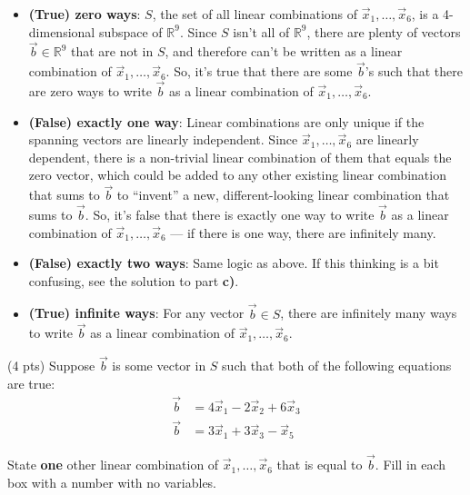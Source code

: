 \documentclass[11pt]{article}
\begin{document}
\begin{prob}[(14 pts)]
\begin{subprob}
\begin{solution}[parts (i)-(iv)]
\begin{itemize}
    \item \textbf{(True) zero ways}: $S$, the set of all linear combinations of $\vec x_1, \ldots, \vec x_6$, is a 4-dimensional subspace of $\mathbb{R}^9$. Since $S$ isn't all of $\mathbb{R}^9$, there are plenty of vectors $\vec b \in \mathbb{R}^9$ that are not in $S$, and therefore can't be written as a linear combination of $\vec x_1, \ldots, \vec x_6$. So, it's true that there are some $\vec b$'s such that there are zero ways to write $\vec b$ as a linear combination of $\vec x_1, \ldots, \vec x_6$.
    \item \textbf{(False) exactly one way}: Linear combinations are only unique if the spanning vectors are linearly independent. Since $\vec x_1, \ldots, \vec x_6$ are linearly dependent, there is a non-trivial linear combination of them that equals the zero vector, which could be added to any other existing linear combination that sums to $\vec b$ to ``invent'' a new, different-looking linear combination that sums to $\vec b$. So, it's false that there is exactly one way to write $\vec b$ as a linear combination of $\vec x_1, \ldots, \vec x_6$ --- if there is one way, there are infinitely many.
    \item \textbf{(False) exactly two ways}: Same logic as above. If this thinking is a bit confusing, see the solution to part \textbf{c)}.
    \item \textbf{(True) infinite ways}: For any vector $\vec b \in S$, there are infinitely many ways to write $\vec b$ as a linear combination of $\vec x_1, \ldots, \vec x_6$.
\end{itemize}

\end{solution}
\end{subprob}

\begin{subprob}(4 pts) Suppose $\vec b$ is some vector in $S$ such that both of the following equations are true:
$$\begin{aligned}
    \vec b &= 4 \vec x_1 - 2 \vec x_2 + 6 \vec x_3 \\
    \vec b &= 3 \vec x_1 + 3 \vec x_3 - \vec x_5
\end{aligned}$$

State \textbf{one} other linear combination of $\vec x_1, \ldots, \vec x_6$ that is equal to $\vec b$. Fill in each box with a number with no variables. \\


\end{subprob}
\end{prob}
\end{document}
